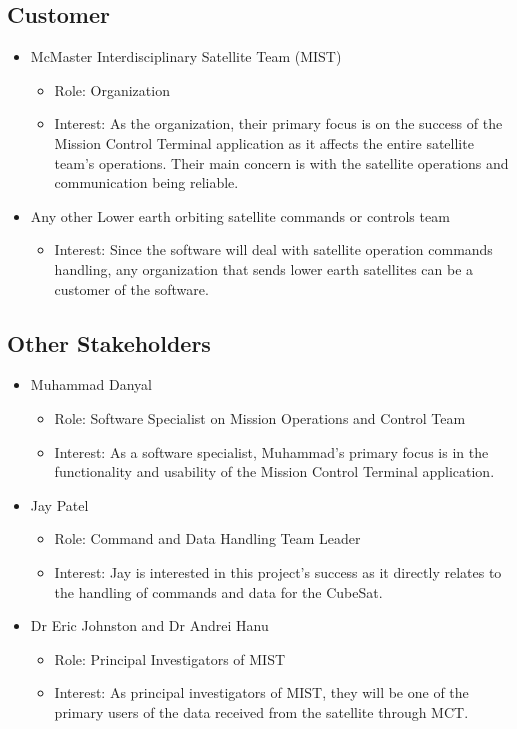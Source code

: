 \documentclass[12pt]{article}
\begin{document}
\subsection{Customer}
\begin{itemize}
    \item McMaster Interdisciplinary Satellite Team (MIST)
    \begin{itemize}
        \item Role: Organization
        \item Interest: As the organization, their primary focus is on the success of the Mission Control Terminal application as it affects the entire satellite team’s operations. Their main concern is with the satellite operations and communication being reliable.

    \end{itemize}
    \item Any other Lower earth orbiting satellite commands or controls team
    \begin{itemize}
        \item Interest: Since the software will deal with satellite operation commands handling, any organization that sends lower earth satellites can be a customer of the software.

    \end{itemize}
    
\end{itemize}

\subsection{Other Stakeholders}
\begin{itemize}
    \item Muhammad Danyal
    \begin{itemize}
        \item Role: Software Specialist on Mission Operations and Control Team
        \item Interest: As a software specialist, Muhammad’s primary focus is in the functionality and usability of the Mission Control Terminal application.

    \end{itemize}
    \item Jay Patel
    \begin{itemize}
        \item Role: Command and Data Handling Team Leader
        \item Interest: Jay is interested in this project’s success as it directly relates to the handling of commands and data for the CubeSat.

    \end{itemize}
    \item Dr Eric Johnston and Dr Andrei Hanu
    \begin{itemize}
        \item Role: Principal Investigators of MIST
        \item Interest: As principal investigators of MIST, they will be one of the primary users of the data received from the satellite through MCT.
    \end{itemize}
\end{itemize}
\end{document}
